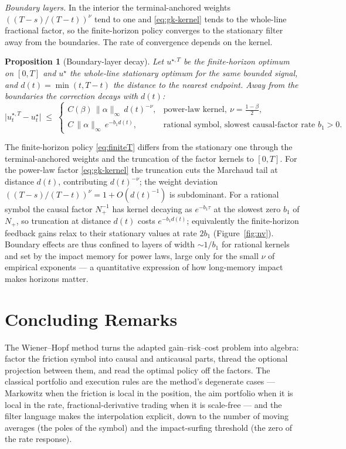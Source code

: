 \documentclass[11pt]{article}
\theoremstyle{plain}
\newtheorem{proposition}{Proposition}
\begin{document}
\emph{Boundary layers.} In the interior the terminal-anchored weights $((T-s)/(T-t))^\nu$ tend to one and \eqref{eq:gk-kernel} tends to the whole-line fractional factor, so the finite-horizon policy converges to the stationary filter away from the boundaries. The rate of convergence depends on the kernel.

\begin{proposition}[Boundary-layer decay]\label{prop:boundary}
Let $u^{\star,T}$ be the finite-horizon optimum on $[0,T]$ and $u^\star$ the whole-line stationary optimum for the same bounded signal, and $d(t)=\min(t,T-t)$ the distance to the nearest endpoint. Away from the boundaries the correction decays with $d(t)$:
\begin{equation}\label{eq:bdry-decay}
\bigl|u^{\star,T}_t - u^\star_t\bigr| \;\le\;
\begin{cases}
C(\beta)\,\|\alpha\|_\infty\,d(t)^{-\nu}, & \text{power-law kernel},\ \nu=\tfrac{1-\beta}{2},\\[3pt]
C\,\|\alpha\|_\infty\,e^{-b_1 d(t)}, & \text{rational symbol, slowest causal-factor rate } b_1>0.
\end{cases}
\end{equation}
\end{proposition}

The finite-horizon policy \eqref{eq:finiteT} differs from the stationary one through the terminal-anchored weights and the truncation of the factor kernels to $[0,T]$. For the power-law factor \eqref{eq:gk-kernel} the truncation cuts the Marchaud tail at distance $d(t)$, contributing $d(t)^{-\nu}$; the weight deviation $((T-s)/(T-t))^\nu = 1+O(d(t)^{-1})$ is subdominant. For a rational symbol the causal factor $N_+^{-1}$ has kernel decaying as $e^{-b_1\tau}$ at the slowest zero $b_1$ of $N_+$, so truncation at distance $d(t)$ costs $e^{-b_1 d(t)}$; equivalently the finite-horizon feedback gains relax to their stationary values at rate $2b_1$ (Figure~\ref{fig:nv}). Boundary effects are thus confined to layers of width $\sim 1/b_1$ for rational kernels and set by the impact memory for power laws, large only for the small $\nu$ of empirical exponents --- a quantitative expression of how long-memory impact makes horizons matter.

\section{Concluding Remarks}

The Wiener--Hopf method turns the adapted gain--risk--cost problem into algebra: factor the friction symbol into causal and anticausal parts, thread the optional projection between them, and read the optimal policy off the factors. The classical portfolio and execution rules are the method's degenerate cases --- Markowitz when the friction is local in the position, the aim portfolio when it is local in the rate, fractional-derivative trading when it is scale-free --- and the filter language makes the interpolation explicit, down to the number of moving averages (the poles of the symbol) and the impact-surfing threshold (the zero of the rate response).
\end{document}
